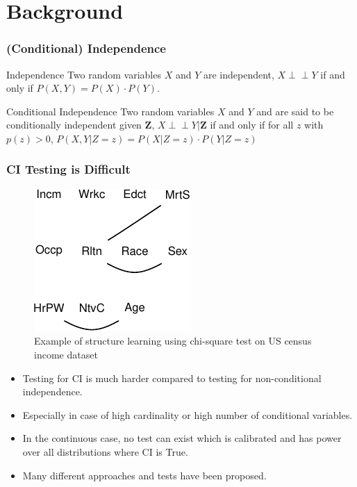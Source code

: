 \documentclass{beamer}
\def\ci{\perp\!\!\!\!\!\perp}
\begin{document}
\section{Background}
\begin{frame}
	\frametitle{(Conditional) Independence}
	\begin{block}{Independence}
		Two random variables $ X $ and $ Y $ are independent,
		$ X \ci Y $ if and only if $ P(X, Y) = P(X) \cdot P(Y) $.
	\end{block}
	\vspace{1em}

	\begin{block}{Conditional Independence}
		Two random variables $ X $ and $ Y $ and are said to be
		conditionally independent given $ \bm{Z} $, $ X \ci Y | \bm{Z}
		$ if and only if for all $ z $ with $ p(z) > 0 $, $ P(X, Y |
		Z=z) = P(X | Z=z) \cdot P(Y | Z=z) $
	\end{block}
\end{frame}

\begin{frame}
	\frametitle{CI Testing is Difficult}
	\begin{figure}
		\centering
		\includegraphics[scale=0.7]{imgs/sl-adult-mi-crop.pdf}
		\caption*{Example of structure learning using chi-square test on US census income dataset}
	\end{figure}
	\begin{itemize}
		\item Testing for CI is much harder compared to testing for
			non-conditional independence.
		\item Especially in case of high cardinality or high number of
			conditional variables.
		\item In the continuous case, no test can exist which is calibrated and
			has power over all distributions where CI is True. \footnotemark
		\item Many different approaches and tests have been proposed.
	\end{itemize}

\end{frame}
\end{document}
